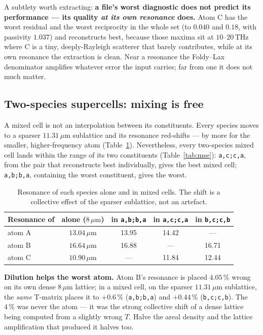 \documentclass[11pt,a4paper]{article}
\newcommand{\um}{\ensuremath{\,\mu\mathrm{m}}}
\newcommand{\THz}{\ensuremath{\,\mathrm{THz}}}
\theoremstyle{plain}
\theoremstyle{definition}
\begin{document}
A subtlety worth extracting: \textbf{a file's worst diagnostic does not predict
its performance --- its quality \emph{at its own resonance} does.} Atom C has the
worst residual and the worst reciprocity in the whole set (to $0.040$ and
$0.18$, with passivity $1.037$) and reconstructs best, because those maxima sit at
$10$--$20\THz$ where C is a tiny, deeply-Rayleigh scatterer that barely
contributes, while at its own resonance the extraction is clean. Near a resonance
the Foldy--Lax denominator amplifies whatever error the input carries; far from
one it does not much matter.

\subsection{Two-species supercells: mixing is free}

A mixed cell is not an interpolation between its constituents. Every species
moves to a sparser $11.31\um$ sublattice and its resonance red-shifts --- by more
for the smaller, higher-frequency atom (Table~\ref{tab:shift}). Nevertheless,
every two-species mixed cell lands within the range of its two constituents
(Table~\ref{tab:mse}): \texttt{a,c;c,a}, from the pair that reconstructs best
individually, gives the best mixed cell; \texttt{a,b;b,a}, containing the worst
constituent, gives the worst.

\begin{table}[htbp]
\centering\small
\caption{Resonance of each species alone and in mixed cells. The shift is a
collective effect of the sparser sublattice, not an artefact.}
\label{tab:shift}
\begin{tabular}{@{}lcccc@{}}
\toprule
Resonance of & alone ($8\um$) & in \texttt{a,b;b,a} & in \texttt{a,c;c,a} & in \texttt{b,c;c,b} \\
\midrule
atom A & $13.04\um$ & 13.95 & 14.42 & --- \\
atom B & $16.64\um$ & 16.88 & --- & 16.71 \\
atom C & $10.90\um$ & --- & 11.84 & 12.44 \\
\bottomrule
\end{tabular}
\end{table}

\textbf{Dilution helps the worst atom.} Atom B's resonance is placed $4.05\,\%$
wrong on its own dense $8\um$ lattice; in a mixed cell, on the sparser
$11.31\um$ sublattice, the \emph{same} T-matrix places it to $+0.6\,\%$
(\texttt{a,b;b,a}) and $+0.44\,\%$ (\texttt{b,c;c,b}). The $4\,\%$ was never the
atom --- it was the strong collective shift of a dense lattice being computed
from a slightly wrong $T$. Halve the areal density and the lattice amplification
that produced it halves too.
\end{document}
